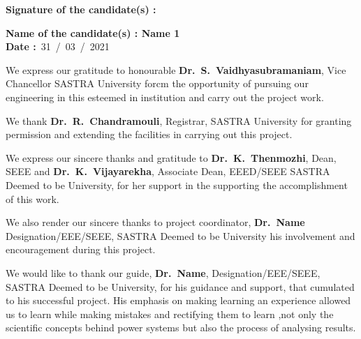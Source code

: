 \documentclass[a4paper, 12pt, oneside]{sastra1}
\begin{document}
	\noindent\textbf{Signature of the candidate(s)	:}	
	
	\noindent\textbf{Name of the candidate(s)\hspace{7mm}		: Name 1}\\
	
	\noindent\textbf{Date\hspace*{43.5mm}					:}~31~/~03~/~2021\\%
	
		\newpage
	
	\externalcertificate
	
	
	
	
	\acknowledgements
	
	\hspace*{12pt} We express our gratitude to honourable \textbf{Dr.~S.~Vaidhyasubramaniam}, Vice Chancellor SASTRA University forcm the opportunity of pursuing our engineering in this esteemed in institution and carry out the project work.
	
	\par We thank \textbf{Dr.~R.~Chandramouli}, Registrar, SASTRA University for granting permission and extending the facilities in carrying out this project.
	
	\par We express our sincere thanks and gratitude to \textbf{Dr.~K.~Thenmozhi}, Dean, SEEE and \textbf{Dr.~K.~Vijayarekha}, Associate Dean, EEED/SEEE SASTRA Deemed to be University, for her support in the supporting the accomplishment of this work.
	
	\par We also render our sincere thanks to project coordinator, \textbf{Dr.~Name} Designation/EEE/SEEE, SASTRA Deemed to be University his involvement and encouragement during this project.
	
	\par We would like to thank our guide, \textbf{Dr.~Name}, Designation/EEE/SEEE, SASTRA Deemed to be University, for his guidance and support, that cumulated to his successful project. His emphasis on making learning an experience allowed us to learn while making mistakes and rectifying them to learn ,not only the scientific concepts behind power systems but also the process of analysing results.
	
\end{document}
